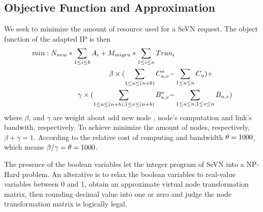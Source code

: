 \subsection{Objective Function and Approximation}
We seek to minimize the amount of resource used for a SeVN request. The object function of the adapted IP is then
\begin{align*}
min: N_{new}*\sum_{1\leq i\leq b}A_i+M_{migra}*\sum_{1\leq i\leq n}Tran_i & \notag \\
\beta \times(\sum_{1\leq u\leq (n+b)}C^o_{u,v}- & \sum_{1\leq u\leq n}C_{u}) + \notag \\
\gamma \times(\sum_{1\leq u\leq (n+b),1\leq v\leq (n+b)}B^o_{u,v}- & \sum_{1\leq u\leq n,1\leq v\leq n}B_{u,v})
\end{align*}
where $\beta$, and $\gamma$ are weight about add new node , node's computation and link's bandwith, respectively. To achieve minimize the amount of nodes, respectively, $\beta+\gamma=1$. According to\cite{armbrust2009above,yu2010survivable} the relative cost of computing and bandwidth $\theta=1000$, which means $\beta/\gamma=\theta=1000$.

The presence of the boolean variables let the integer program of SeVN into a NP-Hard problem. An alterative is to relax the boolean variables to real-value variables between 0 and 1, obtain an approximate virtual node transformation matrix, then rounding decimal value into one or zero and judge the node transformation matrix is logically legal.



